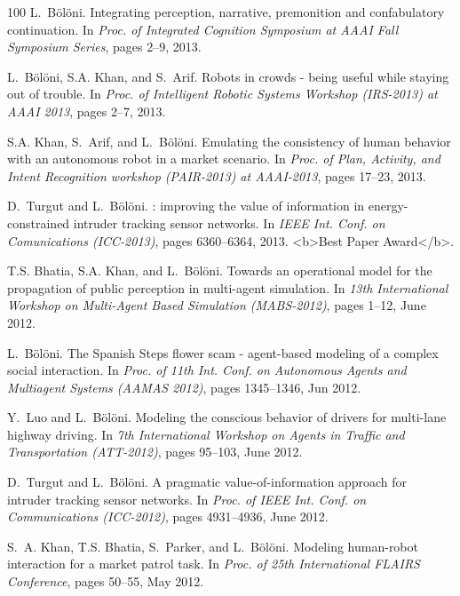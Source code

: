 \begin{thebibliography}{100}
L.~Bölöni.
\newblock Integrating perception, narrative, premonition and confabulatory
  continuation.
\newblock In {\em Proc. of Integrated Cognition Symposium at AAAI Fall
  Symposium Series}, pages 2--9, 2013.

L.~Bölöni, S.A. Khan, and S.~Arif.
\newblock Robots in crowds - being useful while staying out of trouble.
\newblock In {\em Proc. of Intelligent Robotic Systems Workshop (IRS-2013) at
  AAAI 2013}, pages 2--7, 2013.

S.A. Khan, S.~Arif, and L.~Bölöni.
\newblock Emulating the consistency of human behavior with an autonomous robot
  in a market scenario.
\newblock In {\em Proc. of Plan, Activity, and Intent Recognition workshop
  (PAIR-2013) at AAAI-2013}, pages 17--23, 2013.

D.~Turgut and L.~Bölöni.
: improving the value of information in energy-constrained
  intruder tracking sensor networks.
\newblock In {\em IEEE Int. Conf. on Comunications (ICC-2013)}, pages
  6360--6364, 2013.
\newblock <b>Best Paper Award</b>.

T.S. Bhatia, S.A. Khan, and L.~Bölöni.
\newblock Towards an operational model for the propagation of public perception
  in multi-agent simulation.
\newblock In {\em 13th International Workshop on Multi-Agent Based Simulation
  (MABS-2012)}, pages 1--12, June 2012.

L.~Bölöni.
\newblock The {S}panish {S}teps flower scam - agent-based modeling of a complex
  social interaction.
\newblock In {\em Proc. of 11th Int. Conf. on Autonomous Agents and Multiagent
  Systems (AAMAS 2012)}, pages 1345--1346, Jun 2012.

Y.~Luo and L.~Bölöni.
\newblock Modeling the conscious behavior of drivers for multi-lane highway
  driving.
\newblock In {\em 7th International Workshop on Agents in Traffic and
  Transportation (ATT-2012)}, pages 95--103, June 2012.

D.~Turgut and L.~Bölöni.
\newblock A pragmatic value-of-information approach for intruder tracking
  sensor networks.
\newblock In {\em Proc. of IEEE Int. Conf. on Communications (ICC-2012)}, pages
  4931--4936, June 2012.

S.~A. Khan, T.S. Bhatia, S.~Parker, and L.~Bölöni.
\newblock Modeling human-robot interaction for a market patrol task.
\newblock In {\em Proc. of 25th International FLAIRS Conference}, pages 50--55,
  May 2012.


\end{thebibliography}
